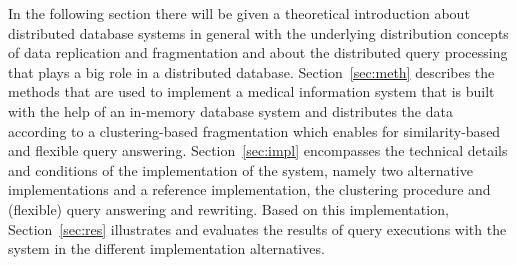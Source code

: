 In the following section there will be given a theoretical introduction about distributed database systems in general with the underlying distribution 
concepts of data replication and fragmentation and about the distributed query processing that plays a big role in a distributed database. 
Section~\ref{sec:meth} describes the methods that are used to implement a medical information system that is built with the help of an in-memory database
system and distributes the data according to a clustering-based fragmentation which enables for similarity-based and flexible query answering.
Section~\ref{sec:impl} encompasses the technical details and conditions of the implementation of the system, namely two alternative implementations and
a reference implementation, the clustering procedure and (flexible) query answering and rewriting. Based on this implementation, Section~\ref{sec:res}
illustrates and evaluates the results of query executions with the system in the different implementation alternatives.


